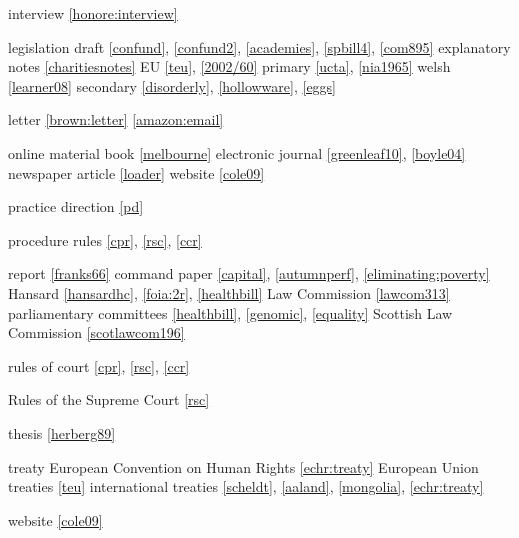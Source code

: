\documentclass[a5paper,fontsize=9pt,DIV=1]{scrartcl}
\begin{document}
{\begin{theindex}
\item interview \ref{honore:interview}

\item legislation
\subitem draft \ref{confund}, \ref{confund2}, \ref{academies}, \ref{spbill4}, \ref{com895} 
\subitem explanatory notes \ref{charitiesnotes}
\subitem EU \ref{teu}, \ref{2002/60}
\subitem primary \ref{ucta}, \ref{nia1965}
\subsubitem welsh \ref{learner08}
\subitem secondary \ref{disorderly}, \ref{hollowware}, \ref{eggs}


\item letter \ref{brown:letter} \ref{amazon:email}

\item online material 
  \subitem book \ref{melbourne}
  \subitem electronic journal \ref{greenleaf10}, \ref{boyle04}
  \subitem newspaper article \ref{loader}
  \subitem website \ref{cole09}

\item practice direction \ref{pd}

\item procedure rules \ref{cpr}, \ref{rsc}, \ref{ccr}

\item report \ref{franks66}
\subitem command paper \ref{capital}, \ref{autumnperf}, \ref{eliminating:poverty}
\subitem Hansard \ref{hansardhc}, \ref{foia:2r}, \ref{healthbill}
\subitem Law Commission \ref{lawcom313}
\subitem parliamentary committees \ref{healthbill}, \ref{genomic}, \ref{equality}
\subitem Scottish Law Commission \ref{scotlawcom196}


\item rules of court \ref{cpr}, \ref{rsc}, \ref{ccr}

\item Rules of the Supreme Court \ref{rsc}

\item thesis \ref{herberg89}

\item treaty
  \subitem European Convention on Human Rights \ref{echr:treaty}
  \subitem European Union treaties \ref{teu}
  \subitem international treaties \ref{scheldt}, \ref{aaland}, \ref{mongolia}, \ref{echr:treaty}

\item website \ref{cole09}
  

\end{theindex}
}



\clearpage
\end{document}
